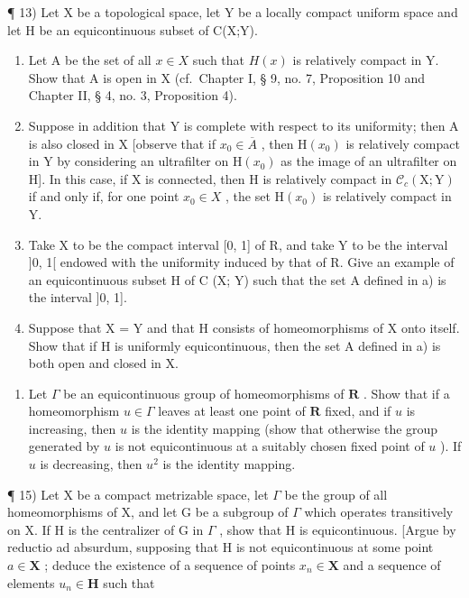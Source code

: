 ¶ 13) Let X be a topological space, let Y be a locally compact uniform space and let H be an equicontinuous subset of C(X;Y).

\begin{enumerate}
\def\labelenumi{\alph{enumi})}
\item
  Let A be the set of all \(x \in X\) such that \(H(x)\) is relatively compact in Y. Show that A is open in X (cf.~Chapter I, § 9, no. 7, Proposition 10 and Chapter II, § 4, no. 3, Proposition 4).
\item
  Suppose in addition that Y is complete with respect to its uniformity; then A is also closed in X {[}observe that if \(x_{0} \in \overline{A}\) , then \(\mathrm{H}(x_{0})\) is relatively compact in Y by considering an ultrafilter on \(\mathrm{H}(x_{0})\) as the image of an ultrafilter on H{]}. In this case, if X is connected, then H is relatively compact in \(\mathcal{C}_{c}(\mathrm{X};\mathrm{Y})\) if and only if, for one point \(x_{0} \in X\) , the set \(\mathrm{H}(x_{0})\) is relatively compact in Y.
\item
  Take X to be the compact interval {[}0, 1{]} of R, and take Y to be the interval {]}0, 1{[} endowed with the uniformity induced by that of R. Give an example of an equicontinuous subset H of C (X; Y) such that the set A defined in a) is the interval {]}0, 1{]}.
\item
  Suppose that X = Y and that H consists of homeomorphisms of X onto itself. Show that if H is uniformly equicontinuous, then the set A defined in a) is both open and closed in X.
\end{enumerate}

\begin{enumerate}
\def\labelenumi{\arabic{enumi})}
\setcounter{enumi}{13}
\tightlist
\item
  Let \(\Gamma\) be an equicontinuous group of homeomorphisms of \(\mathbf{R}\) . Show that if a homeomorphism \(u \in \Gamma\) leaves at least one point of \(\mathbf{R}\) fixed, and if \(u\) is increasing, then \(u\) is the identity mapping (show that otherwise the group generated by \(u\) is not equicontinuous at a suitably chosen fixed point of \(u\) ). If \(u\) is decreasing, then \(u^2\) is the identity mapping.
\end{enumerate}

¶ 15) Let X be a compact metrizable space, let \(\Gamma\) be the group of all homeomorphisms of X, and let G be a subgroup of \(\Gamma\) which operates transitively on X. If H is the centralizer of G in \(\Gamma\) , show that H is equicontinuous. {[}Argue by reductio ad absurdum, supposing that H is not equicontinuous at some point \(a \in \mathbf{X}\) ; deduce the existence of a sequence of points \(x_n \in \mathbf{X}\) and a sequence of elements \(u_n \in \mathbf{H}\) such that

